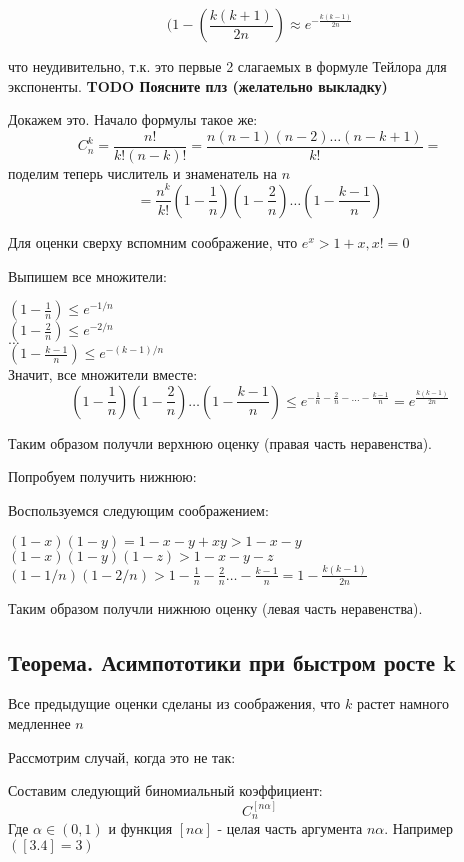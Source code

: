 $$
(1 - \left (\frac{k(k+1)}{2n} \right)
\approx
e^{-\frac{k(k-1)}{2n}}
$$

что неудивительно, т.к. это первые 2 слагаемых в формуле Тейлора для экспоненты.
\textbf{TODO Поясните плз (желательно выкладку)}

Докажем это.
Начало формулы такое же:
$$
C_{n}^{k} = \frac{n!}{k!(n-k)!} = \frac{n(n-1)(n-2) \ldots (n-k+1)}{k!} = 
$$
поделим теперь числитель и знаменатель на $ n $
$$
 = \frac{n^k}{k!}(1 - \frac{1}{n})(1 - \frac{2}{n}) \ldots (1 - \frac{k-1}{n})
$$

Для оценки сверху вспомним соображение, что $ e^x > 1 + x, x != 0 $

Выпишем все множители:

$ (1 - \frac{1}{n}) \le e^{-1/n}  $ \\
$ (1 - \frac{2}{n}) \le e^{-2/n} $ \\
$ \ldots $ \\
$ (1 - \frac{k-1}{n}) \le e^{-(k-1)/n}  $\\

Значит, все множители вместе:
$$
(1 - \frac{1}{n})(1 - \frac{2}{n}) \ldots (1 - \frac{k-1}{n}) \le 
e^{-\frac{1}{n} - \frac{2}{n} - \ldots - \frac{k-1}{n}} = 
e^{ \frac{k(k-1)}{2n} }
$$

Таким образом получли верхнюю оценку (правая часть неравенства).

Попробуем получить нижнюю:


Воспользуемся следующим соображением:

$ (1-x)(1-y) = 1-x-y+xy > 1-x-y $ \\
$ (1-x)(1-y)(1-z) > 1-x-y-z $ \\
$ (1-1/n)(1-2/n) > 1 - \frac{1}{n} - \frac{2}{n} \ldots - \frac{k-1}{n} 
= 1 - \frac{k(k-1)}{2n}$

Таким образом получли нижнюю оценку (левая часть неравенства).

\subsection{Теорема. Асимпототики при быстром росте k}

Все предыдущие оценки сделаны из соображения, что $ k $ 
растет намного медленнее $ n $

Рассмотрим случай, когда это не так:

Составим следующий биномиальный коэффициент:
$$
C_n^{[n \alpha]}
$$
Где $ \alpha \in (0, 1) $ и функция  $ [n \alpha] $ - целая часть аргумента $ n \alpha $. Например $([3.4] = 3) $

